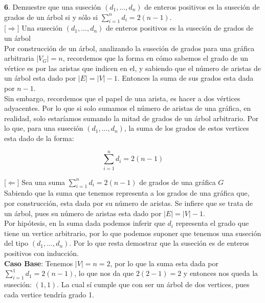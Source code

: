 \documentclass[12pt]{article}
\begin{document}
\vspace{1cm}

%
%
\textbf{6}. Demuestre que una suseción $(d_1,...,d_n)$ de enteros positivos es la suseción de grados de un árbol si
y sólo si $\sum_{i=1}^{n} d_i = 2(n-1)$.\\

{\color{blue} [$\Rightarrow]$} Una suseción $(d_1,...,d_n)$ de enteros positivos es la suseción de grados de un árbol\\

Por construcción de un árbol, analizando la suseción de grados para una gráfica arbitraria $|V_G| = n$, recordemos que 
la forma en cómo sabemos el grado de un vértice es por las aristas que indicen en el, y sabiendo que el número de aristas 
de un árbol esta dado por $|E| = |V|-1$. Entonces la suma de sus grados esta dada por $n-1$.\\

Sin embargo, recordemos que el papel de una arista, es hacer a dos vértices adyacentes. Por lo que si solo sumamos el número 
de aristas de una gráfica, en realidad, solo estaríamos sumando la mitad de grados de un árbol arbitrario. Por lo que, 
para una suseción $(d_1,...,d_n)$, la suma de los grados de estos vertices esta dado de la forma: 

\[
\sum_{i=1}^{n} d_i = 2(n-1)
\]

\vspace{1cm}


{\color{blue} [$\Leftarrow]$} Sea una suma $\sum_{i=1}^{n} d_i = 2(n-1)$ de grados de una gráfica $G$\\

Sabiendo que la suma que tenemos representa a los grados de una gráfica que, por construcción, esta dada por su número de 
aristas. Se infiere que se trata de un árbol, pues su número de aristas esta dado por $|E| = |V|-1$.\\

Por hipótesis, en la suma dada podemos inferir que $d_i$ representa el grado que tiene un vertice arbitrario, por lo que 
podemos suponer que tenemos una suseción del tipo $(d_1,...,d_n)$. Por lo que resta demostrar que la suseción es de enteros 
positivos con inducción.\\

\textbf{Caso Base}: Tenemos $|V| = n =  2$, por lo que la suma esta dada por $\sum_{i=1}^{1} d_1 = 2(n-1)$, lo que nos 
da que $2(2-1) = 2$ y entonces nos queda la suseción: $(1, 1)$. La cual sí cumple que con ser un árbol de dos vertices, 
pues cada vertice tendría grado 1.\\
\end{document}
